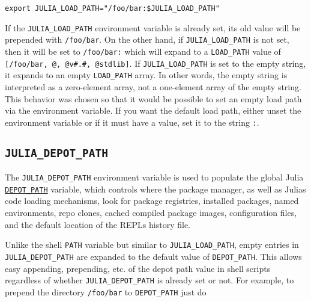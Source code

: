 \begin{lstlisting}
export JULIA_LOAD_PATH="/foo/bar:$JULIA_LOAD_PATH"
\end{lstlisting}



If the \texttt{JULIA\_LOAD\_PATH} environment variable is already set, its old value will be prepended with \texttt{/foo/bar}. On the other hand, if \texttt{JULIA\_LOAD\_PATH} is not set, then it will be set to \texttt{/foo/bar:} which will expand to a \texttt{LOAD\_PATH} value of \texttt{[{\textquotedbl}/foo/bar{\textquotedbl}, {\textquotedbl}@{\textquotedbl}, {\textquotedbl}@v\#.\#{\textquotedbl}, {\textquotedbl}@stdlib{\textquotedbl}]}. If \texttt{JULIA\_LOAD\_PATH} is set to the empty string, it expands to an empty \texttt{LOAD\_PATH} array. In other words, the empty string is interpreted as a zero-element array, not a one-element array of the empty string. This behavior was chosen so that it would be possible to set an empty load path via the environment variable. If you want the default load path, either unset the environment variable or if it must have a value, set it to the string \texttt{:}.



\hypertarget{7415777056556214668}{}


\subsection{\texttt{JULIA\_DEPOT\_PATH}}



The \texttt{JULIA\_DEPOT\_PATH} environment variable is used to populate the global Julia \hyperlink{15271486679944781836}{\texttt{DEPOT\_PATH}} variable, which controls where the package manager, as well as Julia{\textquotesingle}s code loading mechanisms, look for package registries, installed packages, named environments, repo clones, cached compiled package images, configuration files, and the default location of the REPL{\textquotesingle}s history file.



Unlike the shell \texttt{PATH} variable but similar to \texttt{JULIA\_LOAD\_PATH}, empty entries in \texttt{JULIA\_DEPOT\_PATH} are expanded to the default value of \texttt{DEPOT\_PATH}. This allows easy appending, prepending, etc. of the depot path value in shell scripts regardless of whether \texttt{JULIA\_DEPOT\_PATH} is already set or not. For example, to prepend the directory \texttt{/foo/bar} to \texttt{DEPOT\_PATH} just do




